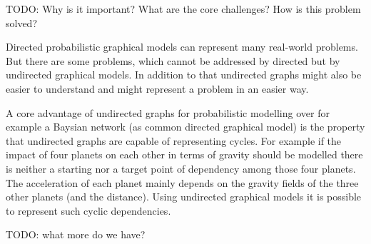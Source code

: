 TODO:  Why is it important? What are the core challenges? How is this problem solved?

Directed probabilistic graphical models can represent many real-world problems. But there are some problems, which cannot be addressed by directed but by undirected graphical models. In addition to that undirected graphs might also be easier to understand and might represent a problem in an easier way.

A core advantage of undirected graphs for probabilistic modelling over for example a Baysian network (as common directed graphical model) is the property that undirected graphs are capable of representing cycles. For example if the impact of four planets on each other in terms of gravity should be modelled there is neither a starting nor a target point of dependency among those four planets. The acceleration of each planet mainly depends on the gravity fields of the three other planets (and the distance). Using undirected graphical models it is possible to represent such cyclic dependencies.

TODO: what more do we have?
